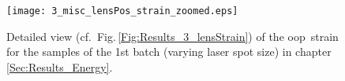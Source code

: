 \begin{figure}[ht]
    \centering
    \texttt{[image: 3\_misc\_lensPos\_strain\_zoomed.eps]}    
    \caption{Detailed view (cf.~Fig.\,\ref{Fig:Results_3_lensStrain}) of the \gls{oop}\ strain for the samples of the 1st batch (varying laser spot size) in chapter \ref{Sec:Results_Energy}.}
    \label{Fig:App_3_lensStrain_zoomed}
\end{figure}